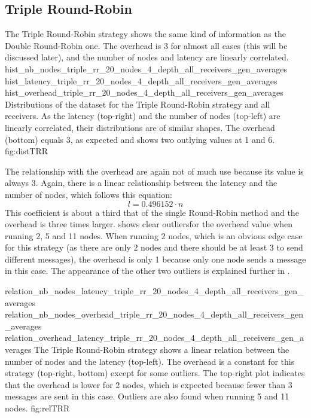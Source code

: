 \FloatBarrier
\subsection{Triple Round-Robin}
\label{ssec:tripleRR}
The Triple Round-Robin strategy shows  the same kind of information as the
Double Round-Robin one. The overhead is 3 for almost all cases (this will be
discussed later), and the number of nodes and latency are linearly correlated.
\triplefigure
    {hist_nb_nodes_triple_rr_20_nodes_4_depth_all_receivers_gen_averages}
    {hist_latency_triple_rr_20_nodes_4_depth_all_receivers_gen_averages}
    {hist_overhead_triple_rr_20_nodes_4_depth_all_receivers_gen_averages}
    {Distributions of the dataset for the Triple Round-Robin strategy and all
    receivers. As the latency (top-right) and the number of nodes (top-left) are
    linearly correlated, their distributions are of similar shapes. The
    overhead (bottom) equals 3, as expected and shows two outlying values at 1
    and 6.}
    {fig:distTRR}

The relationship with the overhead are again not of much use because its value
is always 3. Again, there is a linear relationship between the latency and the
number of nodes, which follows this equation:
    \[l = 0.496152 \cdot n\]
This coefficient is about a third that of the single Round-Robin method and the
overhead is three times larger.
 shows clear outliersfor the overhead value when running
2, 5 and 11 nodes. When running 2 nodes, which is an obvious edge case for this
strategy (as there are only 2 nodes and there should be at least 3 to send
different messages), the overhead is only 1 because only one node sends a
message in this case. The appearance of the other two outliers is explained further in
. 

\triplefigure
    {relation_nb_nodes_latency_triple_rr_20_nodes_4_depth_all_receivers_gen_averages}
    {relation_nb_nodes_overhead_triple_rr_20_nodes_4_depth_all_receivers_gen_averages}
    {relation_overhead_latency_triple_rr_20_nodes_4_depth_all_receivers_gen_averages}
    {The Triple Round-Robin strategy shows a linear relation between the number of
    nodes and the latency (top-left). The overhead is a constant for this
    strategy (top-right, bottom) except for some outliers. The top-right plot
    indicates that the overhead is lower for 2 nodes, which is expected because
    fewer than 3 messages are sent in this case. Outliers are also found when
    running 5 and 11 nodes.}
    {fig:relTRR}

